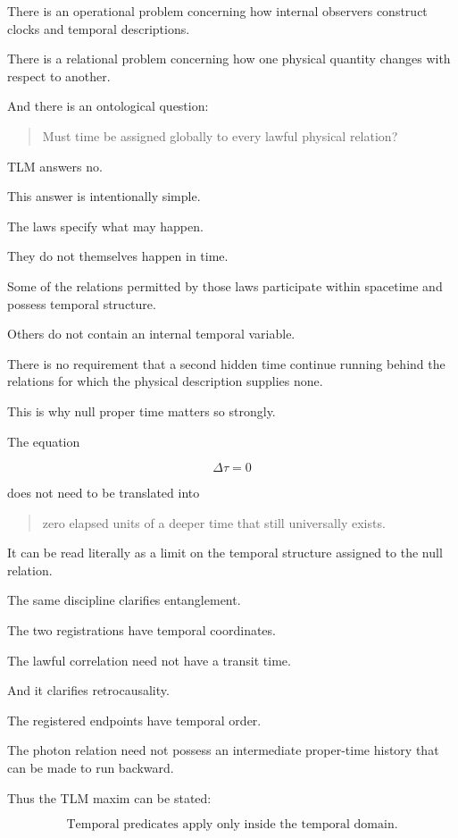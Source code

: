\documentclass[12pt,onecolumn]{article}
\theoremstyle{plain}
\theoremstyle{definition}
\theoremstyle{remark}
\begin{document}
There is an operational problem concerning how internal observers construct
clocks and temporal descriptions.

There is a relational problem concerning how one physical quantity changes
with respect to another.

And there is an ontological question:

\begin{quote}
Must time be assigned globally to every lawful physical relation?
\end{quote}

TLM answers no.

This answer is intentionally simple.

The laws specify what may happen.

They do not themselves happen in time.

Some of the relations permitted by those laws participate within spacetime
and possess temporal structure.

Others do not contain an internal temporal variable.

There is no requirement that a second hidden time continue running behind
the relations for which the physical description supplies none.

This is why null proper time matters so strongly.

The equation

\[
\Delta\tau=0
\]

does not need to be translated into

\begin{quote}
zero elapsed units of a deeper time that still universally exists.
\end{quote}

It can be read literally as a limit on the temporal structure assigned to
the null relation.

The same discipline clarifies entanglement.

The two registrations have temporal coordinates.

The lawful correlation need not have a transit time.

And it clarifies retrocausality.

The registered endpoints have temporal order.

The photon relation need not possess an intermediate proper-time history
that can be made to run backward.

Thus the TLM maxim can be stated:

\[
\boxed{
\text{Temporal predicates apply only inside the temporal domain.}
}
\]
\end{document}
